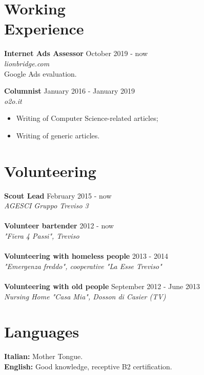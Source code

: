 \documentclass[margin, 10pt]{res}
\begin{document}
\begin{resume}
 
\section{Working \\ Experience}

\textbf{Internet Ads Assessor} \hfill October 2019 - now \\
\textit{lionbridge.com} \\
Google Ads evaluation.

\textbf{Columnist} \hfill January 2016 - January 2019 \\
\textit{o2o.it}
\begin{itemize}
\item Writing of Computer Science-related articles;
\item Writing of generic articles.
\end{itemize} 



\section{Volunteering}

\textbf{Scout Lead} \hfill February 2015 - now \\
\textit{AGESCI Gruppo Treviso 3} \\ \\
\textbf{Volunteer bartender} \hfill 2012 - now \\
\textit{"Fiera 4 Passi", Treviso} \\ \\
\textbf{Volunteering with homeless people} \hfill 2013 - 2014 \\
\textit{"Emergenza freddo", cooperative "La Esse Treviso"} \\ \\
\textbf{Volunteering with old people} \hfill September 2012 - June 2013 \\
\textit{Nursing Home "Casa Mia", Dosson di Casier (TV)} 



\section{Languages}
\textbf{Italian: } Mother Tongue. \\
\textbf{English: } Good knowledge, receptive B2 certification.

\end{resume}
\end{document}
